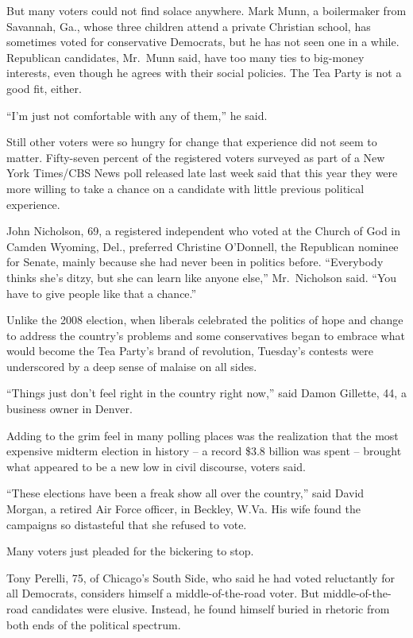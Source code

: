 ﻿\documentclass[12pt]{article}
\begin{document}
But many voters could not find solace anywhere. Mark Munn, a boilermaker from Savannah, Ga., whose
three children attend a private Christian school, has sometimes voted for conservative Democrats,
but he has not seen one in a while. Republican candidates, Mr.~Munn said, have too many ties to
big-money interests, even though he agrees with their social policies. The Tea Party is not a good
fit, either.

``I'm just not comfortable with any of them,'' he said.

Still other voters were so hungry for change that experience did not seem to matter. Fifty-seven
percent of the registered voters surveyed as part of a New York Times/CBS News poll released late
last week said that this year they were more willing to take a chance on a candidate with little
previous political experience.

John Nicholson, 69, a registered independent who voted at the Church of God in Camden Wyoming, Del.,
preferred Christine O'Donnell, the Republican nominee for Senate, mainly because she had never been
in politics before. ``Everybody thinks she's ditzy, but she can learn like anyone else,''
Mr.~Nicholson said. ``You have to give people like that a chance.''

Unlike the 2008 election, when liberals celebrated the politics of hope and change to address the
country's problems and some conservatives began to embrace what would become the Tea Party's brand
of revolution, Tuesday's contests were underscored by a deep sense of malaise on all sides.

``Things just don't feel right in the country right now,'' said Damon Gillette, 44, a business owner
in Denver.

Adding to the grim feel in many polling places was the realization that the most expensive midterm
election in history -- a record \$3.8 billion was spent -- brought what appeared to be a new low in
civil discourse, voters said.

``These elections have been a freak show all over the country,'' said David Morgan, a retired Air
Force officer, in Beckley, W.Va. His wife found the campaigns so distasteful that she refused to
vote.

Many voters just pleaded for the bickering to stop.

Tony Perelli, 75, of Chicago's South Side, who said he had voted reluctantly for all Democrats,
considers himself a middle-of-the-road voter. But middle-of-the-road candidates were elusive.
Instead, he found himself buried in rhetoric from both ends of the political spectrum.
\end{document}
